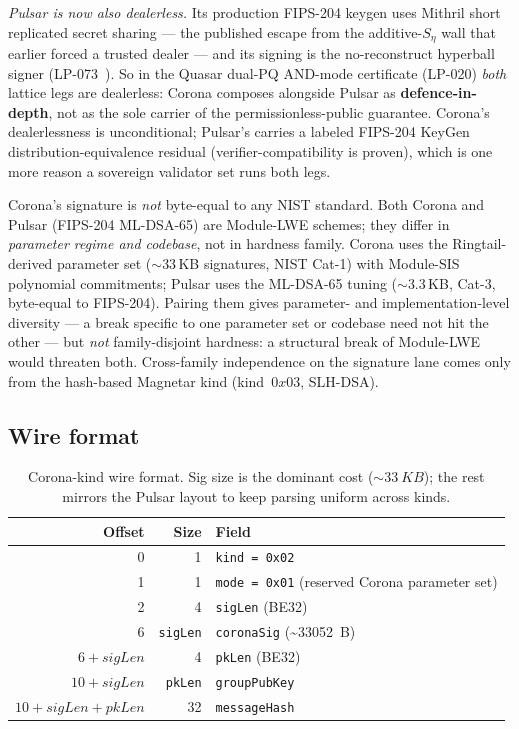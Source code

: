 \emph{Pulsar is now also dealerless.} Its production FIPS-204 keygen uses
Mithril short replicated secret sharing \cite{mithril2026} --- the
published escape from the additive-$S_\eta$ wall that earlier forced a
trusted dealer --- and its signing is the no-reconstruct hyperball signer
(LP-073~\cite{lp073}). So in the Quasar dual-PQ AND-mode certificate
(LP-020) \emph{both} lattice legs are dealerless: Corona composes
alongside Pulsar as \textbf{defence-in-depth}, not as the sole carrier of
the permissionless-public guarantee. Corona's dealerlessness is
unconditional; Pulsar's carries a labeled FIPS-204 KeyGen
distribution-equivalence residual (verifier-compatibility is proven),
which is one more reason a sovereign validator set runs both legs.

Corona's signature is \emph{not} byte-equal to any NIST standard.
Both Corona and Pulsar (FIPS-204 ML-DSA-65) are Module-LWE
schemes; they differ in \emph{parameter regime and codebase}, not
in hardness family. Corona uses the Ringtail-derived parameter
set ($\sim$33\,KB signatures, NIST Cat-1) with Module-SIS
polynomial commitments; Pulsar uses the ML-DSA-65 tuning
($\sim$3.3\,KB, Cat-3, byte-equal to FIPS-204). Pairing them
gives parameter- and implementation-level diversity --- a
break specific to one parameter set or codebase need not hit the
other --- but \emph{not} family-disjoint hardness: a structural
break of Module-LWE would threaten both. Cross-family
independence on the signature lane comes only from the
hash-based Magnetar kind (kind~$0x03$, SLH-DSA).

\subsection{Wire format}

\begin{table}[h]
\centering
\small
\begin{tabular}{@{}rrl@{}}
\toprule
\textbf{Offset} & \textbf{Size} & \textbf{Field} \\
\midrule
0 & 1 & \texttt{kind = 0x02} \\
1 & 1 & \texttt{mode = 0x01} (reserved Corona parameter set) \\
2 & 4 & \texttt{sigLen} (BE32) \\
6 & \texttt{sigLen} & \texttt{coronaSig} (\textasciitilde\SI{33052}{B}) \\
$6{+}\textit{sigLen}$ & 4 & \texttt{pkLen} (BE32) \\
$10{+}\textit{sigLen}$ & \texttt{pkLen} & \texttt{groupPubKey} \\
$10{+}\textit{sigLen}{+}\textit{pkLen}$ & 32 & \texttt{messageHash} \\
\bottomrule
\end{tabular}
\caption{Corona-kind wire format. Sig size is the dominant cost
($\sim\SI{33}{KB}$); the rest mirrors the Pulsar layout to keep
parsing uniform across kinds.}
\label{tab:corona-wire}
\end{table}

